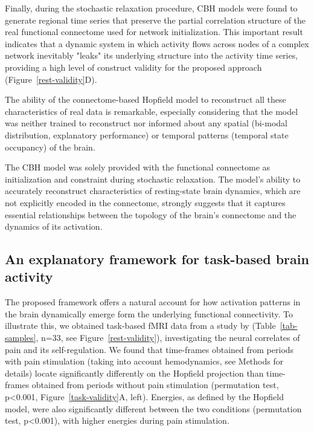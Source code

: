 \documentclass{article}
\begin{document}
Finally, during the stochastic relaxation procedure, CBH models were found to generate regional time series that
preserve the partial correlation structure of the real functional connectome used for network initialization. This
important result indicates that a dynamic system in which activity flows across nodes of a complex network inevitably
"leaks" its underlying structure into the activity time series, providing a high level of construct validity for the
proposed approach (Figure~\ref{rest-validity}D).

The ability of the connectome-based Hopfield model to reconstruct all these characteristics of real data is remarkable,
especially considering that the model was neither trained to reconstruct nor informed about any spatial (bi-modal
distribution, explanatory performance) or temporal patterns (temporal state occupancy) of the brain.

The CBH model was solely provided with the functional connectome as initialization and constraint during stochastic
relaxation. The model's ability to accurately reconstruct characteristics of resting-state brain dynamics, which are
not explicitly encoded in the connectome, strongly suggests that it captures essential relationships between the
topology of the brain's connectome and the dynamics of its activation.

\subsection{An explanatory framework for task-based brain activity}\label{An explanatory framework for task-based brain activity}

The proposed framework offers a natural account for how activation patterns in the brain dynamically emerge form the
underlying functional connectivity. To illustrate this, we obtained task-based fMRI data from a study by
\citep{woo2015distinct} (Table~\ref{tab-samples}, n=33, see Figure~\ref{rest-validity}), investigating the neural
correlates of pain and its self-regulation. We found that time-frames obtained from periods with pain stimulation
(taking into account hemodynamics, see Methods for details) locate significantly differently on the Hopfield projection
than time-frames obtained from periods without pain stimulation (permutation test, p\textless 0.001, Figure~\ref{task-validity}A,
left). Energies, as defined by the Hopfield model, were also significantly different between the two conditions
(permutation test, p\textless 0.001), with higher energies during pain stimulation.
\end{document}
